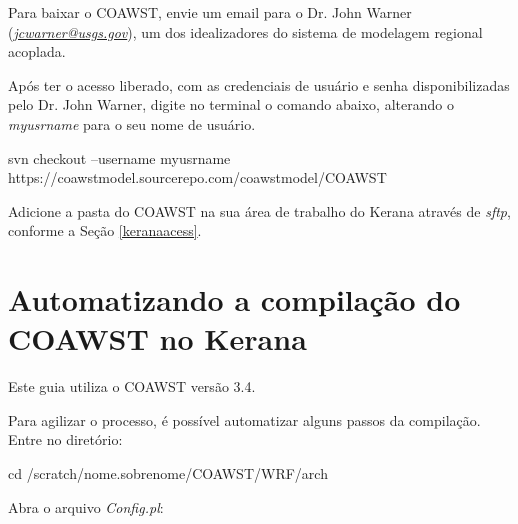 \noindent Para baixar o COAWST, envie um email para o Dr. John Warner (\textcolor{bleu_cite}{\href{jcwarner@usgs.gov}{\textit{jcwarner@usgs.gov}}}), um dos idealizadores do sistema de modelagem regional acoplada.
\bigskip

\noindent Após ter o acesso liberado, com as credenciais de usuário e senha disponibilizadas pelo Dr. John Warner, digite no terminal o comando abaixo, alterando o \textit{myusrname} para o seu nome de usuário.
\bigskip

\begin{bashcode}[fontsize=\footnotesize]
svn checkout --username myusrname https://coawstmodel.sourcerepo.com/coawstmodel/COAWST
\end{bashcode}
\bigskip

\noindent Adicione a pasta do COAWST na sua área de trabalho do Kerana através de \textit{sftp}, conforme a Seção \textcolor{bleu_cite}{\ref{keranaacess}}.
\bigskip

\section{Automatizando a compilação do COAWST no Kerana}\label{autowrf}
\bigskip

\begin{tcolorbox}[enhanced,
  grow to left by=0cm,%
  grow to right by=0cm,%
  enlarge top by=0cm,%
  enlarge bottom by=0cm,%
  tcbox raise base,
  boxrule=1.0pt,
  left=18mm,
  colframe=red!50!black,coltext=red!25!black,colback=red!10!white,
  overlay={\begin{tcbclipinterior}\fill[red!75!blue!50!white] (frame.south west)
    rectangle node[text=white,font=\sffamily\bfseries\footnotesize,rotate=0] {ATENÇÃO} ([xshift=18mm]frame.north west);\end{tcbclipinterior}}]
Este guia utiliza o COAWST versão 3.4.
\end{tcolorbox}
\bigskip

\noindent Para agilizar o processo, é possível automatizar alguns passos da compilação. Entre no diretório:
\bigskip

\begin{bashcode}
cd /scratch/nome.sobrenome/COAWST/WRF/arch
\end{bashcode}
\bigskip

\noindent Abra o arquivo \textit{Config.pl}:
\bigskip

